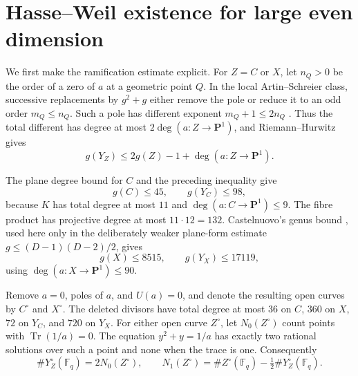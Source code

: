 \documentclass[11pt]{article}
\theoremstyle{definition}\newtheorem{definition}[theorem]{Definition}
\theoremstyle{remark}\newtheorem{remark}[theorem]{Remark}
\DeclareMathOperator{\Tr}{Tr}
\newcommand{\F}{\mathbb F}
\begin{document}
\section{Hasse--Weil existence for large even dimension}
We first make the ramification estimate explicit.  For \(Z=C\) or \(X\), let
\(n_Q>0\) be the order of a zero of \(a\) at a geometric point \(Q\).  In the
local Artin--Schreier class, successive replacements by \(g^2+g\) either
remove the pole or reduce it to an odd order \(m_Q\leq n_Q\).  Such a pole has
different exponent \(m_Q+1\leq2n_Q\)
\cite[Corollary~2.3]{anbar-ramification}.  Thus the total different has degree
at most \(2\deg(a:Z\to\mathbf P^1)\), and Riemann--Hurwitz
\cite[Theorem~3.4.13]{stichtenoth} gives
\[
 g(Y_Z)\leq2g(Z)-1+\deg(a:Z\to\mathbf P^1).
\]

The plane degree bound for \(C\) and the preceding inequality give
\begin{equation}
 g(C)\leq45,\qquad g(Y_C)\leq98,
 \label{eq:genusC}
\end{equation}
because \(K\) has total degree at most \(11\) and
\(\deg(a:C\to\mathbf P^1)\leq9\).  The fibre product has projective degree
at most \(11\cdot12=132\).  Castelnuovo's genus bound
\cite[Ch.~IV, Theorem~6.4]{hartshorne}, used here only in the deliberately
weaker plane-form estimate \(g\leq(D-1)(D-2)/2\), gives
\begin{equation}
 g(X)\leq8515,\qquad g(Y_X)\leq17119,
 \label{eq:genusX}
\end{equation}
using \(\deg(a:X\to\mathbf P^1)\leq90\).

Remove \(a=0\), poles of \(a\), and \(U(a)=0\), and denote the resulting open
curves by \(C^\circ\) and \(X^\circ\).  The deleted divisors have total degree
at most \(36\) on \(C\), \(360\) on \(X\), \(72\) on \(Y_C\), and \(720\) on
\(Y_X\).  For either open curve \(Z^\circ\), let \(N_0(Z^\circ)\) count points
with \(\Tr(1/a)=0\).  The equation \(y^2+y=1/a\) has exactly two rational
solutions over such a point and none when the trace is one.  Consequently
\[
 \#Y_Z^\circ(\F_q)=2N_0(Z^\circ),\qquad
 N_1(Z^\circ)=\#Z^\circ(\F_q)-\tfrac12\#Y_Z^\circ(\F_q).
\]
\end{document}
